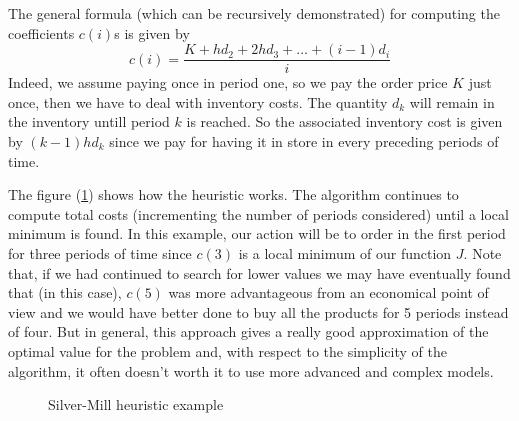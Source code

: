 The general formula (which can be recursively demonstrated) for computing the coefficients $c(i)$s is given by 
\[ c(i) = \frac{K+hd_2+2hd_3+\hdots+(i-1)d_i}{i} \] Indeed, we assume paying once in period one, so we pay the order price $K$ just once, then we have to deal with inventory costs. The quantity $d_k$ will remain in the inventory untill period $k$ is reached. So the associated inventory cost is given by $(k-1)hd_k$ since we pay for having it in store in every preceding periods of time. 

The figure (\ref{periodic:local_minimum}) shows how the heuristic works. The algorithm continues to compute total costs (incrementing the number of periods considered) until a local minimum is found. In this example, our action will be to order in the first period for three periods of time since $c(3)$ is a local minimum of our function $J$. Note that, if we had continued to search for lower values we may have eventually found that (in this case), $c(5)$ was more advantageous from an economical point of view and we would have better done to buy all the products for 5 periods instead of four. But in general, this approach gives a really good approximation of the optimal value for the problem and, with respect to the simplicity of the algorithm, it often doesn't worth it to use more advanced and complex models. 

\begin{figure}
    \centering
    \caption{\label{periodic:local_minimum}Silver-Mill heuristic example}
\end{figure}

